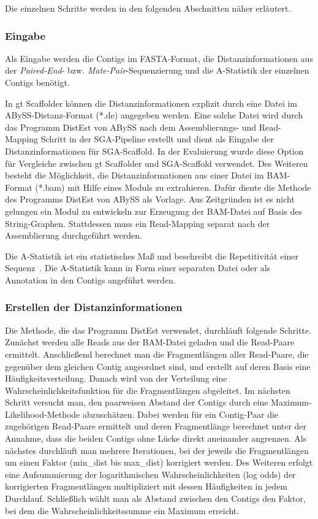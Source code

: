 \documentclass[a4paper,11pt,parskip]{scrartcl}
\begin{document}
Die einzelnen Schritte werden in den folgenden Abschnitten näher erläutert.

\subsubsection{Eingabe}
Als Eingabe werden die Contigs im FASTA-Format, die
Distanzinformationen aus der \textit{Paired-End}-
bzw. \textit{Mate-Pair}-Sequenzierung und die A-Statistik der einzelnen
Contigs benötigt.

In gt Scaffolder können die Distanzinformationen explizit durch eine
Datei im ABySS-Distanz-Format (*.de) angegeben werden. Eine solche
Datei wird durch das Programm DistEst von ABySS nach dem Assemblierungs-
und Read-Mapping Schritt in der SGA-Pipeline erstellt und dient als
Eingabe der Distanzinformationen für SGA-Scaffold. In der Evaluierung
wurde diese Option für Vergleiche zwischen gt Scaffolder und SGA-Scaffold
verwendet. Des Weiteren besteht die Möglichkeit, die Distanzinformationen aus
einer Datei im BAM-Format (*.bam) mit Hilfe eines Moduls zu
extrahieren. Dafür diente die Methode des Programms DistEst von ABySS
als Vorlage. Aus Zeitgründen ist es nicht gelungen ein Modul zu
entwickeln zur Erzeugung der BAM-Datei auf Basis des String-Graphen.
Stattdessen muss ein Read-Mapping separat nach der Assemblierung
durchgeführt werden.

Die A-Statistik ist ein statistisches Maß und beschreibt die Repetitivität
einer Sequenz~\cite{Myers:2005iq}. Die A-Statistik kann in Form einer
separaten Datei oder als Annotation in den Contigs angeführt werden.

\subsubsection{Erstellen der Distanzinformationen}
Die Methode, die das Programm DistEst verwendet, durchläuft folgende
Schritte. Zunächst werden alle Reads aus der BAM-Datei geladen und
die Read-Paare ermittelt. Anschließend berechnet man die Fragmentlängen
aller Read-Paare, die gegenüber dem gleichen Contig angeordnet sind,
und erstellt auf deren Basis eine Häufigkeitsverteilung.
Danach wird von der Verteilung eine Wahrscheinlichkeitsfunktion für die
Fragmentlängen abgeleitet. Im nächsten Schritt versucht man, den paarweisen
Abstand der Contigs durch eine Maximum-Likelihood-Methode abzuschätzen.
Dabei werden für ein Contig-Paar die zugehörigen Read-Paare ermittelt und
deren Fragmentlänge berechnet unter der Annahme, dass die beiden Contigs
ohne Lücke direkt aneinander angrenzen. Als nächstes durchläuft man mehrere
Iterationen, bei der jeweils die Fragmentlängen um einen Faktor (min\_dist
bis max\_dist) korrigiert werden. Des Weiteren erfolgt eine Aufsummierung
der logarithmischen Wahrscheinlichkeiten (log odds) der korrigierten
Fragmentlängen multipliziert mit dessen Häufigkeiten in jedem Durchlauf.
Schließlich wählt man als Abstand zwischen den Contigs den Faktor, bei
dem die Wahrscheinlichkeitssumme ein Maximum erreicht.
\end{document}
